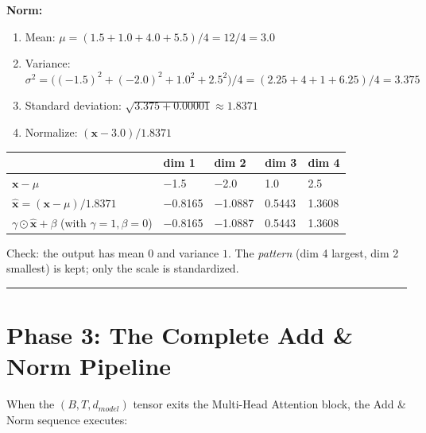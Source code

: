 \documentclass[11pt,a4paper,oneside]{report}
\providecommand{\tightlist}{\setlength{\itemsep}{0pt}\setlength{\parskip}{0pt}}
\begin{document}
\textbf{Norm:}

\begin{enumerate}
\def\labelenumi{\arabic{enumi}.}
\tightlist
\item
  Mean: \(\mu = (1.5 + 1.0 + 4.0 + 5.5) / 4 = 12 / 4 = 3.0\)
\item
  Variance: \(\sigma^2 = \big((-1.5)^2 + (-2.0)^2 + 1.0^2 + 2.5^2\big) / 4 = (2.25 + 4 + 1 + 6.25) / 4 = 3.375\)
\item
  Standard deviation: \(\sqrt{3.375 + 0.00001} \approx 1.8371\)
\item
  Normalize: \((\mathbf{x} - 3.0) / 1.8371\)
\end{enumerate}

{\def\LTcaptype{none} %
\begin{longtable}[]{@{}lllll@{}}
\toprule\noalign{}
& dim 1 & dim 2 & dim 3 & dim 4 \\
\midrule\noalign{}
\endhead
\bottomrule\noalign{}
\endlastfoot
\(\mathbf{x} - \mu\) & −1.5 & −2.0 & 1.0 & 2.5 \\
\(\hat{\mathbf{x}} = (\mathbf{x} - \mu) / 1.8371\) & −0.8165 & −1.0887 & 0.5443 & 1.3608 \\
\(\gamma \odot \hat{\mathbf{x}} + \beta\) (with \(\gamma = 1,\allowbreak \beta = 0\)) & −0.8165 & −1.0887 & 0.5443 & 1.3608 \\
\end{longtable}
}

Check: the output has mean \(0\) and variance \(1\). The \emph{pattern} (dim 4 largest, dim 2 smallest) is kept; only the scale is standardized.

\begin{center}\rule{0.5\linewidth}{0.5pt}\end{center}

\section{Phase 3: The Complete Add \& Norm Pipeline}\label{phase-3-the-complete-add--norm-pipeline}

When the \((B, T, d_{model})\) tensor exits the Multi-Head Attention block, the Add \& Norm sequence executes:
\end{document}
